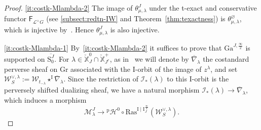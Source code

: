 \documentclass[11pt]{amsart}
\numberwithin{equation}{section}
\theoremstyle{plain}
\theoremstyle{definition}
\newtheorem{claim}[thm]{Claim}
\newcommand{\sH}{{\mathcal H}}
\newcommand{\I}{{\mathrm I}}
\newcommand{\sI}{{\mathcal I}}
\newcommand{\sL}{{\mathcal L}}
\newcommand{\sM}{{\mathcal M}}
\newcommand{\sW}{{\mathcal W}}
\newcommand{\X}{{\mathbb X}}
\newcommand{\Xd}{\check{\X}}
\newcommand{\semi}{{{\frac{\infty}{2}}}}
\newcommand{\quar}{{{\frac{\infty}{4}}}}
\newcommand{\Ras}{\mathrm{Ras}}
\newcommand{\Gr}{\mathrm{Gr}}
\newcommand{\comp}{\mathrm{c}}
\newcommand{\Gait}{\mathrm{Ga}}
\begin{document}
\begin{proof}
\eqref{it:costk-Mlambda-2}
The image of $\theta^J_{\mu,\lambda}$ under the t-exact and conservative functor $\mathsf{F}_{\sL^+G}$ (see \textsection\ref{subsect:redtn-IW} and Theorem~\ref{thm:texactness}) is $\theta^\varnothing_{\mu,\lambda}$, which is injective by~\cite[Lemma~8.1]{adr}. Hence $\theta^J_{\mu,\lambda}$ is also injective.

\eqref{it:costk-Mlambda-1}
By~\eqref{it:costk-Mlambda-2} it suffices to prove that $\Gait^{J,\semi}$ is supported on $\overline{\mathrm{S}^{J}_{0}}$.
For $\lambda\in \Xd^0_J\cap \Xd^+_{J^\comp}$,
as in~\cite{adr} we will denote by $\overline{\nabla}_\lambda$ the costandard perverse sheaf on $\Gr$ associated with the $\I$-orbit of the image of $z^\lambda$, and
set $\sW^{\vee,\lambda}_S:=\sW_{t_{-\lambda}}\star^\I \overline{\nabla}_\lambda$. 
Since the restriction of $\sI_*(\lambda)$ to this $\I$-orbit is the perversely shifted dualizing sheaf, we have a natural morphism $\sI_*(\lambda)\rightarrow \overline{\nabla}_\lambda$, which induces a morphism 
\begin{equation}
\label{equ:Mlambda-pH0-dwaki-1}
\sM^J_\lambda \rightarrow {}^{\mathrm{p}}\sH^0\circ \Ras^{\I\mid \I^\quar_J}(\sW^{\vee,\lambda}_S) . 
\end{equation}


\end{proof}
\end{document}
